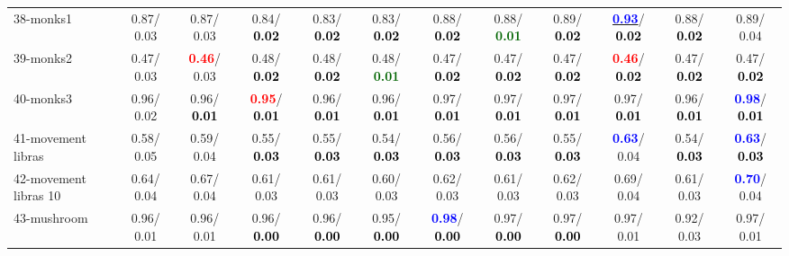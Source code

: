 \begin{table}[h]
\begin{center}
{\begin{tabular}{lc|c|c|c|c|c|c|c|c|c|c}
38-monks1 &   0.87/  0.03 &   0.87/  0.03 &   0.84/\textcolor{black}{\textbf{  0.02}} &   0.83/\textcolor{black}{\textbf{  0.02}} &   0.83/\textcolor{black}{\textbf{  0.02}} &   0.88/\textcolor{black}{\textbf{  0.02}} &   0.88/\textcolor{darkgreen}{\textbf{  0.01}} &   0.89/\textcolor{black}{\textbf{  0.02}} & \underline{\textcolor{blue}{\textbf{  0.93}}}/\textcolor{black}{\textbf{  0.02}} &   0.88/\textcolor{black}{\textbf{  0.02}} &   0.89/  0.04 \\
39-monks2 &   0.47/  0.03 & \textcolor{red}{\textbf{  0.46}}/  0.03 &   0.48/\textcolor{black}{\textbf{  0.02}} &   0.48/\textcolor{black}{\textbf{  0.02}} &   0.48/\textcolor{darkgreen}{\textbf{  0.01}} &   0.47/\textcolor{black}{\textbf{  0.02}} &   0.47/\textcolor{black}{\textbf{  0.02}} &   0.47/\textcolor{black}{\textbf{  0.02}} & \textcolor{red}{\textbf{  0.46}}/\textcolor{black}{\textbf{  0.02}} &   0.47/\textcolor{black}{\textbf{  0.02}} &   0.47/\textcolor{black}{\textbf{  0.02}} \\ \hline
40-monks3 &   0.96/  0.02 &   0.96/\textcolor{black}{\textbf{  0.01}} & \textcolor{red}{\textbf{  0.95}}/\textcolor{black}{\textbf{  0.01}} &   0.96/\textcolor{black}{\textbf{  0.01}} &   0.96/\textcolor{black}{\textbf{  0.01}} &   0.97/\textcolor{black}{\textbf{  0.01}} &   0.97/\textcolor{black}{\textbf{  0.01}} &   0.97/\textcolor{black}{\textbf{  0.01}} &   0.97/\textcolor{black}{\textbf{  0.01}} &   0.96/\textcolor{black}{\textbf{  0.01}} & \textcolor{blue}{\textbf{  0.98}}/\textcolor{black}{\textbf{  0.01}} \\
41-movement libras &   0.58/  0.05 &   0.59/  0.04 &   0.55/\textcolor{black}{\textbf{  0.03}} &   0.55/\textcolor{black}{\textbf{  0.03}} &   0.54/\textcolor{black}{\textbf{  0.03}} &   0.56/\textcolor{black}{\textbf{  0.03}} &   0.56/\textcolor{black}{\textbf{  0.03}} &   0.55/\textcolor{black}{\textbf{  0.03}} & \textcolor{blue}{\textbf{  0.63}}/  0.04 &   0.54/\textcolor{black}{\textbf{  0.03}} & \textcolor{blue}{\textbf{  0.63}}/\textcolor{black}{\textbf{  0.03}} \\
42-movement libras 10 &   0.64/  0.04 &   0.67/  0.04 &   0.61/  0.03 &   0.61/  0.03 &   0.60/  0.03 &   0.62/  0.03 &   0.61/  0.03 &   0.62/  0.03 &   0.69/  0.04 &   0.61/  0.03 & \textcolor{blue}{\textbf{  0.70}}/  0.04 \\
43-mushroom &   0.96/  0.01 &   0.96/  0.01 &   0.96/\textcolor{black}{\textbf{  0.00}} &   0.96/\textcolor{black}{\textbf{  0.00}} &   0.95/\textcolor{black}{\textbf{  0.00}} & \textcolor{blue}{\textbf{  0.98}}/\textcolor{black}{\textbf{  0.00}} &   0.97/\textcolor{black}{\textbf{  0.00}} &   0.97/\textcolor{black}{\textbf{  0.00}} &   0.97/  0.01 &   0.92/  0.03 &   0.97/  0.01 \\

\end{tabular}}
\end{center}
\end{table}

